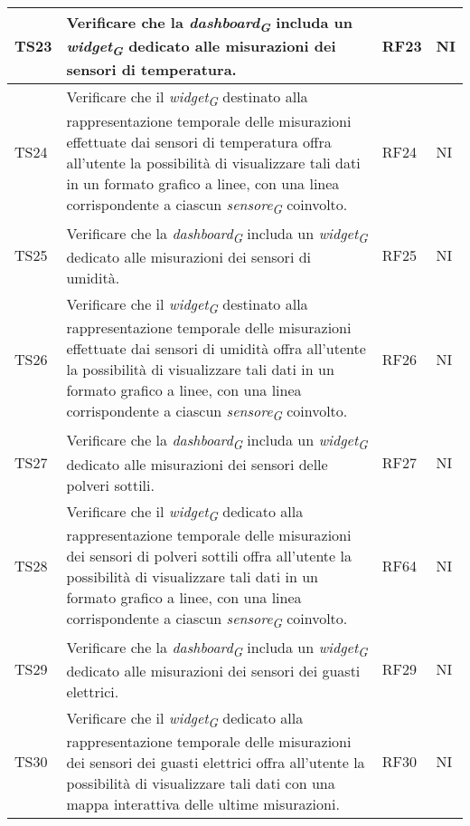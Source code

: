 \begin{longtable}{|C{1.9cm}|L{5cm}|C{2cm}|C{2cm}|}
    TS23 & Verificare che la \textit{dashboard}\textsubscript{\textit{G}} includa un \textit{widget}\textsubscript{\textit{G}} dedicato alle misurazioni dei sensori di temperatura. & RF23 & NI \\
    \hline

    TS24 & Verificare che il \textit{widget}\textsubscript{\textit{G}} destinato alla rappresentazione temporale delle misurazioni effettuate dai sensori di temperatura offra all'utente la possibilità di visualizzare tali dati in un formato grafico a linee, con una linea corrispondente a ciascun \textit{sensore}\textsubscript{\textit{G}} coinvolto. & RF24 & NI \\
    \hline

    TS25 & Verificare che la \textit{dashboard}\textsubscript{\textit{G}} includa un \textit{widget}\textsubscript{\textit{G}} dedicato alle misurazioni dei sensori di umidità. & RF25 & NI \\
    \hline

    TS26 & Verificare che il \textit{widget}\textsubscript{\textit{G}} destinato alla rappresentazione temporale delle misurazioni effettuate dai sensori di umidità offra all'utente la possibilità di visualizzare tali dati in un formato grafico a linee, con una linea corrispondente a ciascun \textit{sensore}\textsubscript{\textit{G}} coinvolto. & RF26 & NI \\
    \hline

    TS27 & Verificare che la \textit{dashboard}\textsubscript{\textit{G}} includa un \textit{widget}\textsubscript{\textit{G}} dedicato alle misurazioni dei sensori delle polveri sottili. & RF27 & NI \\
    \hline

    TS28 & Verificare che il \textit{widget}\textsubscript{\textit{G}} dedicato alla rappresentazione temporale delle misurazioni dei sensori di polveri sottili offra all'utente la possibilità di visualizzare tali dati in un formato grafico a linee, con una linea corrispondente a ciascun \textit{sensore}\textsubscript{\textit{G}} coinvolto. & RF64 & NI \\
    \hline

    TS29 & Verificare che la \textit{dashboard}\textsubscript{\textit{G}} includa un \textit{widget}\textsubscript{\textit{G}} dedicato alle misurazioni dei sensori dei guasti elettrici. & RF29 & NI \\
    \hline

    TS30 & Verificare che il \textit{widget}\textsubscript{\textit{G}} dedicato alla rappresentazione temporale delle misurazioni dei sensori dei guasti elettrici offra all'utente la possibilità di visualizzare tali dati con una mappa interattiva delle ultime misurazioni. & RF30 & NI \\
    \hline


\end{longtable}
